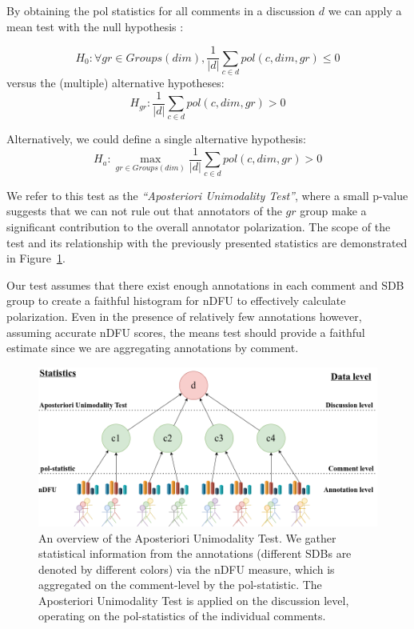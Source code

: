 \documentclass{article}
\newcommand{\sdbdim}{\textit{dim}}
\newcommand{\sdbgroup}{\textit{gr}}
\newcommand{\Sdbgroup}{\textit{Groups}}
\begin{document}
By obtaining the pol statistics for all comments in a discussion $d$ we can apply a mean test with the null hypothesis :

\begin{equation}
	\label{eq:null_h}
	H_0: \forall \sdbgroup \in \Sdbgroup(\sdbdim), \frac{1}{\lvert d \rvert} \sum\limits_{c \in d} pol(c, \sdbdim,  \sdbgroup) \le 0
\end{equation}
\noindent versus the (multiple) alternative hypotheses: 
\begin{equation}
	\label{eq:alt_h}
	H_{\sdbgroup}:\frac{1}{\lvert d \rvert} \sum\limits_{c \in d}  pol(c, \sdbdim, \sdbgroup) >  0
\end{equation}

Alternatively, we could define a single alternative hypothesis:
\begin{equation}
	\label{eq:single_alt_h}
	H_a: \max_{\sdbgroup \in \Sdbgroup(\sdbdim)}\frac{1}{\lvert d \rvert} \sum\limits_{c \in d}  pol(c, \sdbdim, \sdbgroup) >  0
\end{equation}

We refer to this test as the \textit{``Aposteriori Unimodality Test''}, where a small p-value suggests that we can not rule out that annotators of the $\sdbgroup$ group make a significant contribution to the overall annotator polarization. The scope of the test and its relationship with the previously presented statistics are demonstrated in Figure~\ref{fig::overview}.

Our test assumes that there exist enough annotations in each comment and \ac{SDB} group to create a faithful histogram for \ac{nDFU} to effectively calculate polarization. Even in the presence of relatively few annotations however, assuming accurate \ac{nDFU} scores, the means test should provide a faithful estimate since we are aggregating annotations by comment.

\begin{figure}
	\includegraphics[width=\linewidth]{overview.png}
	\caption{An overview of the Aposteriori Unimodality Test. We gather statistical information from the annotations (different \acp{SDB} are denoted by different colors) via the \ac{nDFU} measure, which is aggregated on the comment-level by the pol-statistic. The Aposteriori Unimodality Test is applied on the discussion level, operating on the pol-statistics of the individual comments.}
	\label{fig::overview}
\end{figure}
\end{document}
